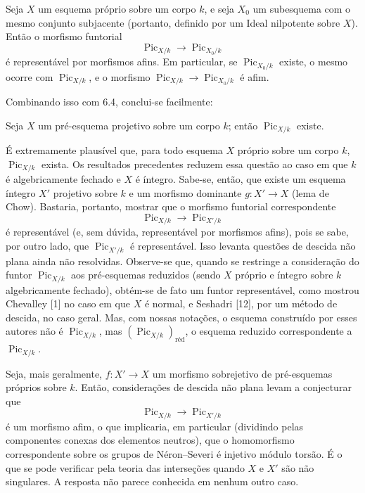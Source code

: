  Seja $X$ um esquema próprio sobre um corpo $k$, e seja
$X_0$ um subesquema com o mesmo conjunto subjacente (portanto, definido por um
Ideal nilpotente sobre $X$). Então o morfismo funtorial
\[
\operatorname{Pic}_{X/k}\longrightarrow\operatorname{Pic}_{X_0/k}
\]
é representável por morfismos afins. Em particular, se
$\operatorname{Pic}_{X_0/k}$ existe, o mesmo ocorre com
$\operatorname{Pic}_{X/k}$, e o morfismo
$\operatorname{Pic}_{X/k}\longrightarrow\operatorname{Pic}_{X_0/k}$ é afim.

Combinando isso com 6.4, conclui-se facilmente:

 Seja $X$ um pré-esquema projetivo sobre um corpo $k$;
então $\operatorname{Pic}_{X/k}$ existe.

 É extremamente plausível que, para todo esquema $X$
próprio sobre um corpo $k$, $\operatorname{Pic}_{X/k}$ exista. Os resultados precedentes reduzem essa questão ao caso em que $k$ é
algebricamente fechado e $X$ é íntegro. Sabe-se, então, que existe um esquema
íntegro $X'$ projetivo sobre $k$ e um morfismo dominante
$g:X'\longrightarrow X$ (lema de Chow). Bastaria, portanto, mostrar que o
morfismo funtorial correspondente
\[
\operatorname{Pic}_{X/k}\longrightarrow\operatorname{Pic}_{X'/k}
\]
é representável (e, sem dúvida, representável por morfismos afins), pois se
sabe, por outro lado, que $\operatorname{Pic}_{X'/k}$ é representável. Isso
levanta questões de descida não plana ainda não resolvidas. Observe-se que,
quando se restringe a consideração do funtor $\operatorname{Pic}_{X/k}$ aos
pré-esquemas reduzidos (sendo $X$ próprio e íntegro sobre $k$ algebricamente
fechado), obtém-se de fato um funtor representável, como mostrou Chevalley [1]
no caso em que $X$ é normal, e Seshadri [12], por um método de descida, no caso
geral. Mas, com nossas notações, o esquema construído por esses autores não é
$\operatorname{Pic}_{X/k}$, mas
$(\operatorname{Pic}_{X/k})_{\mathrm{réd}}$, o esquema reduzido correspondente
a $\operatorname{Pic}_{X/k}$.

 Seja, mais geralmente, $f:X'\longrightarrow X$ um
morfismo sobrejetivo de pré-esquemas próprios sobre $k$. Então, considerações de
descida não plana levam a conjecturar que
\[
\operatorname{Pic}_{X/k}\longrightarrow\operatorname{Pic}_{X'/k}
\]
é um morfismo afim, o que implicaria, em particular (dividindo pelas
componentes conexas dos elementos neutros), que o homomorfismo correspondente
sobre os grupos de Néron--Severi é injetivo módulo torsão. É o que se pode
verificar pela teoria das interseções quando $X$ e $X'$ são não singulares. A
resposta não parece conhecida em nenhum outro caso.


